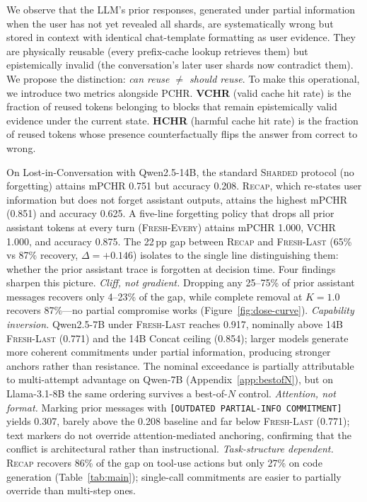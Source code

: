 \documentclass{article}
\begin{document}
We observe that the LLM's prior responses, generated under partial information when the user has not yet revealed all shards, are systematically wrong but stored in context with identical chat-template formatting as user evidence. They are physically reusable (every prefix-cache lookup retrieves them) but epistemically invalid (the conversation's later user shards now contradict them). We propose the distinction: \emph{can reuse $\neq$ should reuse}. To make this operational, we introduce two metrics alongside PCHR. \textbf{VCHR} (valid cache hit rate) is the fraction of reused tokens belonging to blocks that remain epistemically valid evidence under the current state. \textbf{HCHR} (harmful cache hit rate) is the fraction of reused tokens whose presence counterfactually flips the answer from correct to wrong.

On Lost-in-Conversation with Qwen2.5-14B, the standard \textsc{Sharded} protocol (no forgetting) attains mPCHR 0.751 but accuracy 0.208. \textsc{Recap}, which re-states user information but does not forget assistant outputs, attains the highest mPCHR (0.851) and accuracy 0.625. A five-line forgetting policy that drops all prior assistant tokens at every turn (\textsc{Fresh-Every}) attains mPCHR 1.000, VCHR 1.000, and accuracy 0.875. The 22\,pp gap between \textsc{Recap} and \textsc{Fresh-Last} (65\% vs 87\% recovery, $\Delta{=}+0.146$) isolates to the single line distinguishing them: whether the prior assistant trace is forgotten at decision time. Four findings sharpen this picture. \emph{Cliff, not gradient.} Dropping any 25--75\% of prior assistant messages recovers only 4--23\% of the gap, while complete removal at $K{=}1.0$ recovers 87\%---no partial compromise works (Figure~\ref{fig:dose-curve}). \emph{Capability inversion.} Qwen2.5-7B under \textsc{Fresh-Last} reaches 0.917, nominally above 14B \textsc{Fresh-Last} (0.771) and the 14B Concat ceiling (0.854); larger models generate more coherent commitments under partial information, producing stronger anchors rather than resistance. The nominal exceedance is partially attributable to multi-attempt advantage on Qwen-7B (Appendix~\ref{app:bestofN}), but on Llama-3.1-8B the same ordering survives a best-of-$N$ control. \emph{Attention, not format.} Marking prior messages with \texttt{[OUTDATED PARTIAL-INFO COMMITMENT]} yields 0.307, barely above the 0.208 baseline and far below \textsc{Fresh-Last} (0.771); text markers do not override attention-mediated anchoring, confirming that the conflict is architectural rather than instructional. \emph{Task-structure dependent.} \textsc{Recap} recovers 86\% of the gap on tool-use actions but only 27\% on code generation (Table~\ref{tab:main}); single-call commitments are easier to partially override than multi-step ones.
\end{document}
